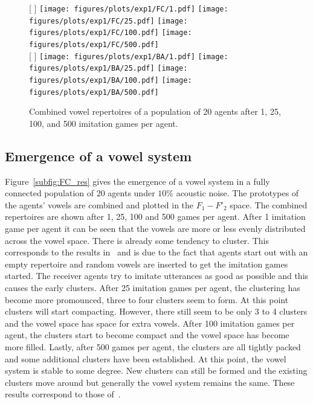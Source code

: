 \documentclass{article}
\begin{document}
\begin{figure}[t]
    \centering
    [%
        \textwidth %
    ]%
    {%
        \texttt{[image: figures/plots/exp1/FC/1.pdf]}
        \texttt{[image: figures/plots/exp1/FC/25.pdf]}
        \texttt{[image: figures/plots/exp1/FC/100.pdf]}
        \texttt{[image: figures/plots/exp1/FC/500.pdf]}
    }%
    \\\bigskip
    [%
        \textwidth %
    ]%
    {%
        \texttt{[image: figures/plots/exp1/BA/1.pdf]}
        \texttt{[image: figures/plots/exp1/BA/25.pdf]}
        \texttt{[image: figures/plots/exp1/BA/100.pdf]}
        \texttt{[image: figures/plots/exp1/BA/500.pdf]}
    }%
    \caption{Combined vowel repertoires of a population of 20 agents after 1, 25, 100, and 500
        imitation games per agent.}
    \label{fig:res}
\end{figure}

\subsection{Emergence of a vowel system}
Figure~\ref{subfig:FC_res} gives the emergence of a vowel system in a fully connected population of 20 agents under $10\%$ acoustic noise.
The prototypes of the agents' vowels are combined and plotted in the $F_1-F'_2$ space. The combined repertoires are shown after 1, 25, 100 and 500 games per agent.
After 1 imitation game per agent it can be seen that the vowels are more or less evenly distributed across the vowel space. There is already some tendency to cluster.
This corresponds to the results in~ and is due to the fact that agents start out with an empty repertoire and
random vowels are inserted to get the imitation games started. The receiver agents try to imitate utterances as good as possible and this causes the early clusters.
After 25 imitation games per agent, the clustering has become more promounced, three to four clusters seem to form. At this point clusters will start compacting.
However, there still seem to be only 3 to 4 clusters and the vowel space has space for extra vowels.
After 100 imitation games per agent, the clusters start to become compact and the vowel space has become more filled.
Lastly, after 500 games per agent, the clusters are all tightly packed and some additional clusters have been established.
At this point, the vowel system is stable to some degree. New clusters can still be formed and the existing clusters move around but generally the vowel system remains the same.
These results correspond to those of~.
\end{document}
